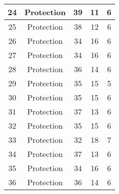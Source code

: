 \documentclass[results.tex]{subfiles}
\begin{document}
\begin{center}
\begin{tabular}{| c || c | c | c | c |}
            \hline
            24                      & Protection                   & 39                     & 11                      & 6                    \\
            \hline
            25                      & Protection                   & 38                     & 12                      & 6                    \\
            \hline
            26                      & Protection                   & 34                     & 16                      & 6                    \\
            \hline
            27                      & Protection                   & 34                     & 16                      & 6                    \\
            \hline
            28                      & Protection                   & 36                     & 14                      & 6                    \\
            \hline
            29                      & Protection                   & 35                     & 15                      & 5                    \\
            \hline
            30                      & Protection                   & 35                     & 15                      & 6                    \\
            \hline
            31                      & Protection                   & 37                     & 13                      & 6                    \\
            \hline
            32                      & Protection                   & 35                     & 15                      & 6                    \\
            \hline
            33                      & Protection                   & 32                     & 18                      & 7                    \\
            \hline
            34                      & Protection                   & 37                     & 13                      & 6                    \\
            \hline
            35                      & Protection                   & 34                     & 16                      & 6                    \\
            \hline
            36                      & Protection                   & 36                     & 14                      & 6                    \\

\end{tabular}
\end{center}
\end{document}
